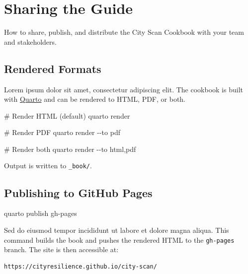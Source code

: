 \documentclass[
  letterpaper,
  DIV=11,
  numbers=noendperiod]{scrreprt}
\newenvironment{Shaded}{\begin{snugshade}}{\end{snugshade}}
\newcommand{\AttributeTok}[1]{\textcolor[rgb]{0.40,0.45,0.13}{#1}}
\newcommand{\CommentTok}[1]{\textcolor[rgb]{0.37,0.37,0.37}{#1}}
\newcommand{\ExtensionTok}[1]{\textcolor[rgb]{0.00,0.23,0.31}{#1}}
\newcommand{\NormalTok}[1]{\textcolor[rgb]{0.00,0.23,0.31}{#1}}
\begin{document}
\chapter{Sharing the Guide}\label{sharing-the-guide}

How to share, publish, and distribute the City Scan Cookbook with your
team and stakeholders.

\section{Rendered Formats}\label{rendered-formats}

Lorem ipsum dolor sit amet, consectetur adipiscing elit. The cookbook is
built with \href{https://quarto.org}{Quarto} and can be rendered to
HTML, PDF, or both.

\begin{Shaded}
\begin{Highlighting}[]
\CommentTok{\# Render HTML (default)}
\ExtensionTok{quarto}\NormalTok{ render}

\CommentTok{\# Render PDF}
\ExtensionTok{quarto}\NormalTok{ render }\AttributeTok{{-}{-}to}\NormalTok{ pdf}

\CommentTok{\# Render both}
\ExtensionTok{quarto}\NormalTok{ render }\AttributeTok{{-}{-}to}\NormalTok{ html,pdf}
\end{Highlighting}
\end{Shaded}

Output is written to \texttt{\_book/}.

\section{Publishing to GitHub Pages}\label{publishing-to-github-pages}

\begin{Shaded}
\begin{Highlighting}[]
\ExtensionTok{quarto}\NormalTok{ publish gh{-}pages}
\end{Highlighting}
\end{Shaded}

Sed do eiusmod tempor incididunt ut labore et dolore magna aliqua. This
command builds the book and pushes the rendered HTML to the
\texttt{gh-pages} branch. The site is then accessible at:

\begin{verbatim}
https://cityresilience.github.io/city-scan/
\end{verbatim}
\end{document}
